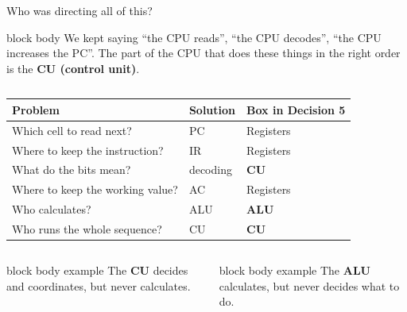 \documentclass[aspectratio=169,10pt]{beamer}
\newcommand{\cpupanel}[5]{%
  \node[draw=nLine, very thick, rounded corners=6pt, fill=nFill!50, minimum width=4.65cm,
    minimum height=3.85cm, anchor=west] (cpu) at (2.45,-0.2) {};
  \node[font=\scriptsize\bfseries, text=nInk, anchor=north west] at ([shift={(0.1,-0.06)}]cpu.north west) {CPU};
  \ifnum#1>0 \node[reg] (pc) at (3.65,0.95) {\textbf{PC}\ \ #2}; \fi
  \ifnum#1>1 \node[reg] (ir) at (3.65,0.0) {\textbf{IR}\\[-1pt]#3}; \fi
  \ifnum#1>2 \node[reg] (ac) at (3.65,-1.05) {\textbf{AC}\ \ #4}; \fi
  \ifnum#1>3 \node[cpuunit, draw=nLine, fill=nFill, text=nInk, #5] (alu) at (6.3,-1.05)
    {\faCalculator\\[-1pt]ALU}; \fi
  \ifnum#1>4 \node[cpuunit, draw=nLine, fill=nFill, text=nInk] (cu) at (6.3,0.5)
    {\faCogs\\[-1pt]CU}; \fi
}
\begin{document}
\begin{frame}{Who was directing all of this?}
  \begin{beamercolorbox}[rounded=true,sep=0.14cm,wd=\textwidth]{block body}
    \centering\small
    We kept saying ``the CPU reads'', ``the CPU decodes'', ``the CPU increases the PC''.
    The part of the CPU that does these things in the right order is the \textbf{CU (control unit)}.
  \end{beamercolorbox}
  \vspace{0.1cm}
  \begin{columns}[c,onlytextwidth]
      \centering
      \centering
      \scriptsize
      \renewcommand{\arraystretch}{1.2}
      \begin{tabular}{lll}
        \toprule
        \textbf{Problem} & \textbf{Solution} & \textbf{Box in Decision 5} \\
        \midrule
        Which cell to read next? & PC & \colorbox{yellow!30}{Registers} \\
        Where to keep the instruction? & IR & \colorbox{yellow!30}{Registers} \\
        What do the bits mean? & decoding & \textbf{CU} \\
        Where to keep the working value? & AC & \colorbox{yellow!30}{Registers} \\
        Who calculates? & ALU & \textbf{ALU} \\
        Who runs the whole sequence? & CU & \textbf{CU} \\
        \bottomrule
      \end{tabular}
  \end{columns}
  \vspace{0.15cm}
  \begin{columns}[T,onlytextwidth]
      \begin{beamercolorbox}[rounded=true,sep=0.12cm,wd=\linewidth]{block body example}
        \centering\footnotesize
        The \textbf{CU} decides and coordinates, but never calculates.
      \end{beamercolorbox}
      \begin{beamercolorbox}[rounded=true,sep=0.12cm,wd=\linewidth]{block body example}
        \centering\footnotesize
        The \textbf{ALU} calculates, but never decides what to do.
      \end{beamercolorbox}
  \end{columns}
\end{frame}
\end{document}
